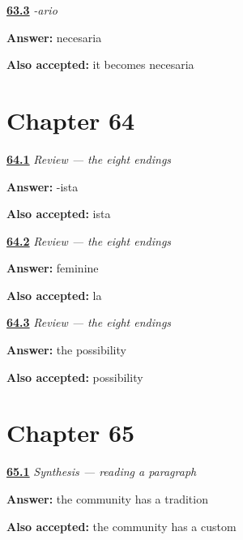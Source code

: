 \noindent\begin{minipage}[t]{\linewidth}
\raggedright
\hyperlink{review-ES-C09-ario-shift}{\textbf{63.3}} \emph{-ario}\par
\small \textbf{Answer:} necesaria\par
\footnotesize \textbf{Also accepted:} it becomes necesaria
\end{minipage}\par\medskip

\section*{Chapter 64}

\noindent\begin{minipage}[t]{\linewidth}
\raggedright
\hyperlink{review-ES-C09-repaso-ocho-sort}{\textbf{64.1}} \emph{Review — the eight endings}\par
\small \textbf{Answer:} -ista\par
\footnotesize \textbf{Also accepted:} ista
\end{minipage}\par\medskip

\noindent\begin{minipage}[t]{\linewidth}
\raggedright
\hyperlink{review-ES-C09-repaso-ocho-gender}{\textbf{64.2}} \emph{Review — the eight endings}\par
\small \textbf{Answer:} feminine\par
\footnotesize \textbf{Also accepted:} la
\end{minipage}\par\medskip

\noindent\begin{minipage}[t]{\linewidth}
\raggedright
\hyperlink{review-ES-C09-repaso-ocho-reach}{\textbf{64.3}} \emph{Review — the eight endings}\par
\small \textbf{Answer:} the possibility\par
\footnotesize \textbf{Also accepted:} possibility
\end{minipage}\par\medskip

\section*{Chapter 65}

\noindent\begin{minipage}[t]{\linewidth}
\raggedright
\hyperlink{review-ES-C09-sintesis-ocho-read}{\textbf{65.1}} \emph{Synthesis — reading a paragraph}\par
\small \textbf{Answer:} the community has a tradition\par
\footnotesize \textbf{Also accepted:} the community has a custom
\end{minipage}\par\medskip

